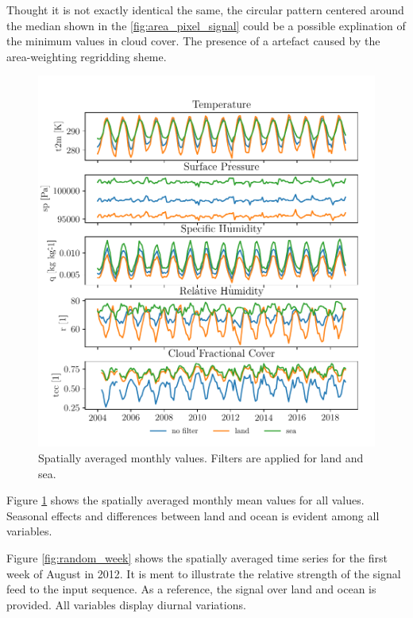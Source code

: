 Thought it is not exactly identical the same, the circular pattern centered around the median shown in the \ref{fig:area_pixel_signal} could be a possible explination of the minimum values in cloud cover. The presence of a artefact caused by the area-weighting regridding sheme.

\begin{figure}[ht]
    \centering
    \includegraphics{python_figs/monthly_means.pdf}
    \caption{Spatially averaged monthly values. Filters are applied for land and sea.}
    \label{fig:monthly_mean_ts_vars}
\end{figure}
Figure \ref{fig:monthly_mean_ts_vars} shows the spatially averaged monthly mean values for all values. Seasonal effects and differences between land and ocean is evident among all variables.


Figure \ref{fig:random_week} shows the spatially averaged time series for the first week of August in 2012. It is ment to illustrate the relative strength of the signal feed to the input sequence. As a reference, the signal over land and ocean is provided. All variables display diurnal variations.

